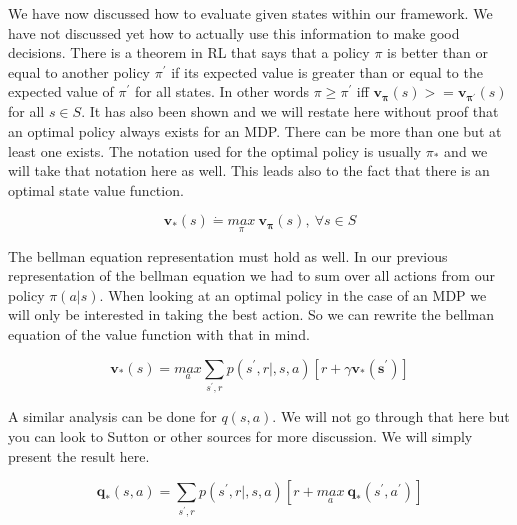 We have now discussed how to evaluate given states within our framework. We have not discussed yet how to actually use this information to make good decisions. There is a theorem in RL that says that a policy $\pi$ is better than or equal to another policy $\pi^{'}$ if its expected value is greater than or equal to the expected value of $\pi^{'}$ for all states. In other words $ \pi \geq \pi^{'} $ iff $ \mathbf{v_{\pi}}(s) >= \mathbf{v_{\pi^{'}}}(s)$ for all $ s \in  S$. It has also been shown and we will restate here without proof that an optimal policy always exists for an MDP. There can be more than one but at least one exists. The notation used for the optimal policy is usually $\pi_{*}$ and we will take that notation here as well. This leads also to the fact that there is an optimal state value function. 

\begin{equation}\label{Optimal State Value Equation}
\mathbf{v_{*}}(s) \dot{=} \underset{\pi}{max} \: \mathbf{v_{\pi}}(s) , \: \forall s \in S 
\end{equation}

The bellman equation representation must hold as well. In our previous representation of the bellman equation we had to sum over all actions from our policy $\pi(a |s)$. When looking at an optimal policy in the case of an MDP we will only be interested in taking the best action. So we can rewrite the bellman equation of the value function with that in mind. 

\begin{equation}\label{Optimal Bellman State Value Equation}
\mathbf{v_{*}}(s)= \underset{a}{max}\underset{s^{'},r}{\sum}p(s^{'},r|,s,a)[ r + \gamma \mathbf{v_{*}(s^{'})}]
\end{equation}


A similar analysis can be done for $q(s,a)$. We will not go through that here but you can look to Sutton or other sources for more discussion. We will simply present the result here. 

\begin{equation}\label{Optimal Bellman State Action Value Equation}
\mathbf{q_{*}}(s,a)= \underset{s^{'},r}{\sum}p(s^{'},r|,s,a)[ r + \underset{a}{max} \: \mathbf{q_{*}}(s^{'},a^{'})]
\end{equation}


